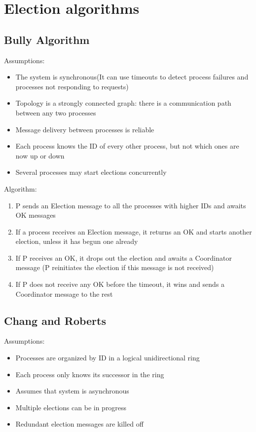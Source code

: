 \section{Election algorithms}
\subsection{Bully Algorithm}

Assumptions:
\begin{itemize}
    \item The system is synchronous(It can use timeouts to detect process failures and processes not responding to requests)
    \item Topology is a strongly connected graph: there is a communication path between any two processes
    \item Message delivery between processes is reliable
    \item Each process knows the ID of every other process, but not which ones are now up or down
    \item Several processes may start elections concurrently
\end{itemize}

Algorithm:
\begin{enumerate}
    \item P sends an Election message to all the processes with higher IDs and awaits OK messages
    \item If a process receives an Election message, it returns an OK and starts another election, unless it has begun one already
    \item If P receives an OK, it drops out the election and awaits a Coordinator message (P reinitiates the election if this message is not received)
    \item If P does not receive any OK before the timeout, it wins and sends a Coordinator message to the rest
\end{enumerate}
\subsection{Chang and Roberts}
Assumptions:
\begin{itemize}
    \item Processes are organized by ID in a logical unidirectional ring
    \item Each process only knows its successor in the ring
    \item Assumes that system is asynchronous
    \item Multiple elections can be in progress
    \item Redundant election messages are killed off
\end{itemize}

